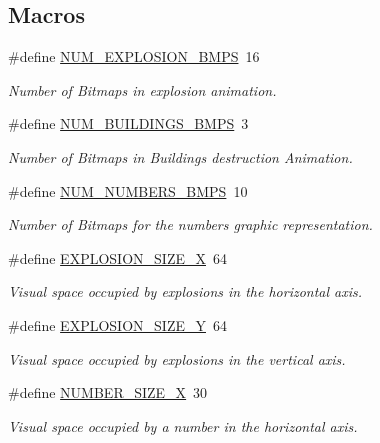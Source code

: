 \subsection*{Macros}
\begin{DoxyCompactItemize}
\item 
\#define \hyperlink{group___b_m_ps_holder_ga8cbb8366563bf839a123c77c9dce4654}{N\+U\+M\+\_\+\+E\+X\+P\+L\+O\+S\+I\+O\+N\+\_\+\+B\+M\+PS}~16
\begin{DoxyCompactList}\small\item\em Number of Bitmaps in explosion animation. \end{DoxyCompactList}\item 
\#define \hyperlink{group___b_m_ps_holder_ga879ee79215c5f7b42458ebd3e9258d9a}{N\+U\+M\+\_\+\+B\+U\+I\+L\+D\+I\+N\+G\+S\+\_\+\+B\+M\+PS}~3
\begin{DoxyCompactList}\small\item\em Number of Bitmaps in Buildings destruction Animation. \end{DoxyCompactList}\item 
\#define \hyperlink{group___b_m_ps_holder_ga004574e130b898860d0098ccc3a1a924}{N\+U\+M\+\_\+\+N\+U\+M\+B\+E\+R\+S\+\_\+\+B\+M\+PS}~10
\begin{DoxyCompactList}\small\item\em Number of Bitmaps for the numbers graphic representation. \end{DoxyCompactList}\item 
\#define \hyperlink{group___b_m_ps_holder_ga05fea38384e3b8729c157fb3370d6c91}{E\+X\+P\+L\+O\+S\+I\+O\+N\+\_\+\+S\+I\+Z\+E\+\_\+X}~64
\begin{DoxyCompactList}\small\item\em Visual space occupied by explosions in the horizontal axis. \end{DoxyCompactList}\item 
\#define \hyperlink{group___b_m_ps_holder_ga0eb35331668d32bc55b98c41006da26d}{E\+X\+P\+L\+O\+S\+I\+O\+N\+\_\+\+S\+I\+Z\+E\+\_\+Y}~64
\begin{DoxyCompactList}\small\item\em Visual space occupied by explosions in the vertical axis. \end{DoxyCompactList}\item 
\#define \hyperlink{group___b_m_ps_holder_gaabac832414071a82ad7b568988fe6a68}{N\+U\+M\+B\+E\+R\+\_\+\+S\+I\+Z\+E\+\_\+X}~30
\begin{DoxyCompactList}\small\item\em Visual space occupied by a number in the horizontal axis. \end{DoxyCompactList}\item 

\end{DoxyCompactItemize}
